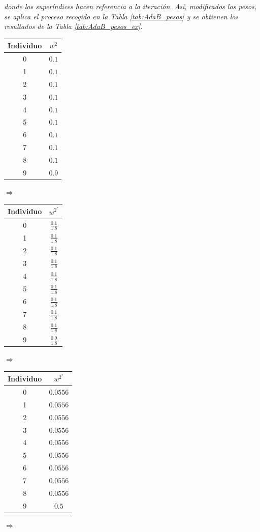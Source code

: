 \documentclass[12pt,twoside]{article}
\begin{document}
\noindent
\textit{donde los superíndices hacen referencia a la iteración. Así, modificados los pesos, se aplica el proceso recogido en la Tabla \ref{tab:AdaB_pesos} y se obtienen los resultados de la Tabla \ref{tab:AdaB_pesos_ex}. }
\begin{table}[h]
\centering
\begin{tabular}{|c|c|}
\hline
Individuo & $w^2$ \\ \hline
0 & $0.1$ \\ \hline
1 & $0.1$ \\ \hline
2 & $0.1$ \\ \hline
3 & $0.1$ \\ \hline
4 & $0.1$ \\ \hline
5 & $0.1$ \\ \hline
6 & $0.1$ \\ \hline
7 & $0.1$ \\ \hline
8 & $0.1$ \\ \hline
9 & $0.9$ \\ \hline
\end{tabular}
$\Rightarrow$
\begin{tabular}{|c|c|}
\hline
Individuo & $w^{2^*}$ \\ \hline
0 & $\frac{0.1}{1.8}$ \\ \hline
1 & $\frac{0.1}{1.8}$ \\ \hline
2 & $\frac{0.1}{1.8}$ \\ \hline
3 & $\frac{0.1}{1.8}$ \\ \hline
4 & $\frac{0.1}{1.8}$ \\ \hline
5 & $\frac{0.1}{1.8}$ \\ \hline
6 & $\frac{0.1}{1.8}$ \\ \hline
7 & $\frac{0.1}{1.8}$ \\ \hline
8 & $\frac{0.1}{1.8}$ \\ \hline
9 & $\frac{0.9}{1.8}$ \\ \hline
\end{tabular}
$\Rightarrow$
\begin{tabular}{|c|c|}
\hline
Individuo & $w^{2^*}$ \\ \hline
0 & $0.0556$ \\ \hline
1 & $0.0556$ \\ \hline
2 & $0.0556$ \\ \hline
3 & $0.0556$ \\ \hline
4 & $0.0556$ \\ \hline
5 & $0.0556$ \\ \hline
6 & $0.0556$ \\ \hline
7 & $0.0556$ \\ \hline
8 & $0.0556$ \\ \hline
9 & $0.5$ \\ \hline
\end{tabular}
$\Rightarrow$
\end{table}
\end{document}
